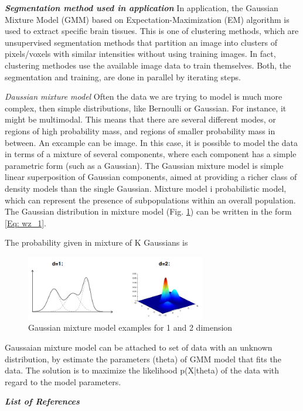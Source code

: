\textbf{\textit{Segmentation method used in application}}
In application, the Gaussian Mixture Model (GMM) based on Expectation-Maximization (EM) algorithm  is used to extract specific brain tissues. This is one of clustering methods, which are unsupervised segmentation methods that partition an image into clusters of pixels/voxels with similar intensities without using training images. In fact, clustering methodes use the available image data to train themselves. Both, the segmentation and training, are done in parallel by iterating steps. 

\textit{Daussian mixture model}
Often the data we are trying to model is much more complex, then simple distributions, like Bernoulli or Gaussian.  For instance, it might be multimodal.  This means  that  there  are  several  different modes,  or  regions  of  high  probability  mass,  and regions of smaller probability mass in between. An excample can be image. In this case, it is possible to model the data in terms of a mixture of several components, where each component has a simple parametric form (such as a Gaussian).
The Gaussian mixture model is simple linear superposition of Gaussian components, aimed at providing a richer class of density models than the single Gaussian. Mixture model i probabilistic model, which can represent the presence of subpopulations within an overall population. 
The Gaussian distribution in mixture model (Fig. \ref{fig:figures/m09_4}) can be written in the form \ref{Eq: wz_1}.


The probability given in mixture of K Gaussians is 

\begin{figure}[h]
\centering{}\includegraphics[width=0.7\textwidth]{figures/Module_09/m09_4}\caption{Gaussian mixture model examples for 1 and 2 dimension  \label{fig:figures/m09_4}}
\end{figure}

Gaussaian mixture model can be attached to set of data  with an unknown distribution, by estimate the parameters (theta) of GMM model that fits the data. The solution is to maximize the likelihood p(X|theta) of the data with regard to the model parameters. 

\textit{\textbf{List of References}}\\
\cite{09a1}